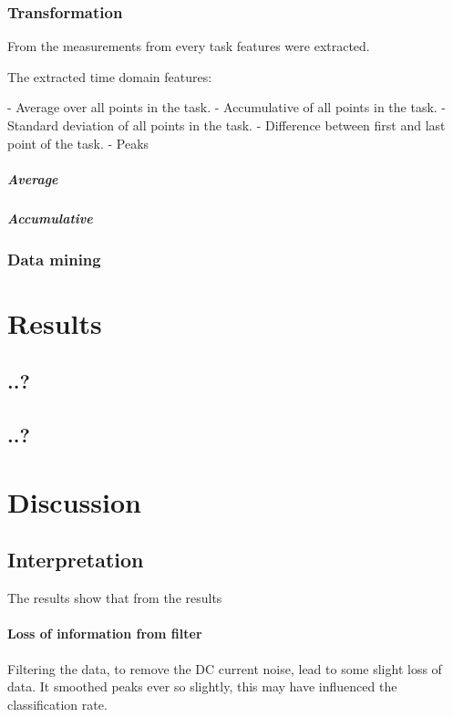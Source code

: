\documentclass[12pt,leqno,letterpaper]{report} %
\begin{document}
\subsection{Transformation}
From the measurements from every task features were extracted. 

The extracted time domain features:

- Average over all points in the task.
- Accumulative of all points in the task.
- Standard deviation of all points in the task.
- Difference between first and last point of the task.
- Peaks

\paragraph{Average}

\paragraph{Accumulative}


\subsection{Data mining}


\chapter{Results}

\section{..?}
\section{..?}

\chapter{Discussion}
\section{Interpretation}
The results show that from the results


\subsubsection{Loss of information from filter}
Filtering the data, to remove the DC current noise, lead to some slight loss of data. It smoothed peaks ever so slightly, this may have influenced the classification rate.
\end{document}

